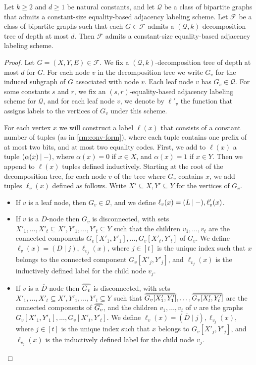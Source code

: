 \documentclass{theoretics}
\newcommand\eqLabelSep{\mathbin|}
\newcommand{\cF}{\ensuremath{\mathcal{F}}}
\newcommand{\cQ}{\ensuremath{\mathcal{Q}}}
\newcommand\doverline[1]{%
  \setbox0=\hbox{$\!\overline{#1}\!$}%
  \ht0=\dimexpr\ht0-.2ex\relax%
  \,\overline{\copy0}\,%
}
\newcommand{\bc}[1]{\doverline{#1}} %
\begin{document}
\begin{lemma}
\label{lemma:bipartite decomposition}
Let $k \geq 2$ and $d \geq 1$ be natural constants, and let $\cQ$ be a class of bipartite graphs that
admits a constant-size equality-based adjacency labeling scheme.
Let $\cF$ be a class of bipartite graphs such that each $G \in \cF$ admits a $(\cQ, k)$-decomposition
tree of depth at most $d$. Then $\cF$ admits a constant-size equality-based adjacency labeling scheme. 
\end{lemma}
\begin{proof}
Let $G=(X,Y,E) \in \cF$. We fix a $(\cQ, k)$-decomposition tree of depth at most $d$ for $G$.
For each node $v$ in the decomposition tree we write $G_v$ for the induced subgraph
of $G$ associated with node $v$.  Each leaf node $v$ has $G_v \in \cQ$. 
For some constants $s$ and $r$, we fix an $(s,r)$-equality-based adjacency labeling scheme for $\cQ$, and for each leaf node $v$, we denote by $\ell'_v$ the function that assigns labels to the vertices of $G_v$ under this scheme.

For each vertex $x$ we will construct a label $\ell(x)$ that consists of a constant number of tuples (as in \cref{rm:conv-form}),
where each tuple contains one prefix of at most two bits, and at most two equality codes.
First, we add to $\ell(x)$ a tuple  $(\alpha(x) \eqLabelSep \mathnormal- )$, where $\alpha(x)=0$ if $x \in X$, and $\alpha(x)=1$
if $x \in Y$. Then we append to $\ell(x)$ tuples defined inductively.
Starting at the root of the decomposition tree, for each node $v$ of the tree where $G_v$ 
contains $x$, we add tuples $\ell_v(x)$ defined as follows.  
Write $X' \subseteq X, Y' \subseteq Y$ for the vertices of $G_v$.
\begin{itemize}
\item If $v$ is a leaf node, then $G_v \in \cQ$, and we define $\ell_v(x) = (L \eqLabelSep \mathnormal-), \ell'_v(x)$.

\item If $v$ is a $D$-node then $G_v$ is disconnected, with sets $X'_1, \dotsc, X'_t \subseteq X',
Y'_1, \dotsc, Y'_t \subseteq Y$ such that the children $v_1, \dotsc, v_t$ are the connected
components $G_v[X'_1, Y'_1], \dotsc, G_v[X'_t, Y'_t]$ of $G_v$. 
We define $\ell_v(x) = (D \eqLabelSep j), \ell_{v_j}(x)$, where $j \in [t]$ is the unique index such that $x$ belongs to the connected component $G_v[X'_j, Y'_j]$, and $\ell_{v_j}(x)$ is the inductively defined label for the child node $v_j$.

\item If $v$ is a $\overline D$-node then $\bc{G_v}$ is disconnected, with sets $X'_1, \dotsc, X'_t \subseteq X',
Y'_1, \dotsc, Y'_t \subseteq Y$ such that $\bc{G_v[X_1',Y_1']}, \dotsc,  \bc{G_v[X_t',Y_t']}$ 
are the connected components of $\bc{G_v}$, and the children $v_1, \dotsc, v_t$ of $v$ are the graphs $G_v[X'_1, Y'_1], \dotsc, G_v[X'_t, Y'_t]$. 
We define $\ell_v(x) = (\overline D \eqLabelSep j), \ell_{v_j}(x)$, where $j \in [t]$ is the unique index such that $x$ belongs to $G_v[X'_j, Y'_j]$, and $\ell_{v_j}(x)$ is the inductively defined label for the child node $v_j$.


\end{itemize}
\end{proof}
\end{document}

